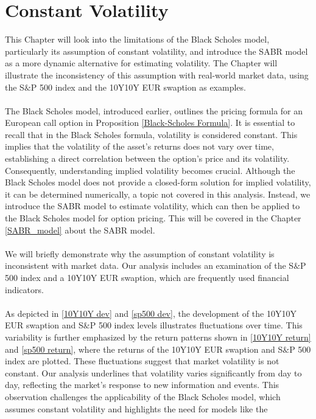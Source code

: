 \section{Constant Volatility} \label{cont_vol}
This Chapter will look into the limitations 
of the Black Scholes model, particularly its 
assumption of constant volatility, and introduce 
the SABR model as a more dynamic alternative for estimating volatility. 
The Chapter will illustrate the inconsistency of 
this assumption with real-world market data, 
using the S$\&$P 500 index and the 10Y10Y EUR swaption 
as examples.
\\\\
The Black Scholes model, introduced earlier, outlines the pricing formula for an European call option in 
Proposition \autoref{Black-Scholes Formula}. It is  essential to recall that in the Black Scholes formula, 
volatility is considered constant. This implies that the volatility of the asset's returns does not vary over time,
establishing a direct correlation between the option's price and its volatility. Consequently, 
understanding implied volatility becomes crucial. Although the Black Scholes model does not provide 
a closed-form solution for implied volatility, it can be determined numerically, a topic not covered 
in this analysis. Instead, we introduce the SABR model to estimate volatility, which can then be 
applied to the Black Scholes model for option pricing. This will be covered in the Chapter \ref{SABR_model} about the 
SABR model. 
\\\\
We will briefly demonstrate why the assumption of constant volatility is inconsistent with market data. 
Our analysis includes an examination of the S$\&$P 500 index and a 10Y10Y EUR swaption, which are frequently used 
financial indicators. 
\\\\
As depicted in \autoref{10Y10Y dev} and \autoref{sp500 dev}, the development of the 10Y10Y EUR swaption 
and S$\&$P 500 index levels illustrates fluctuations over time. This variability is further emphasized by the return patterns 
shown in \autoref{10Y10Y return} and \autoref{sp500 return}, where the returns of the 10Y10Y EUR swaption and S$\&$P 500 index are plotted. 
These fluctuations suggest that market volatility is not constant. Our analysis underlines that volatility varies 
significantly from day to day, reflecting the market's response to new information and events. This observation challenges 
the applicability of the Black Scholes model, which assumes constant volatility and highlights the need for models like the 
